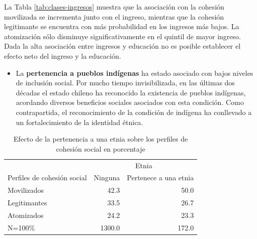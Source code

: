 \documentclass[
  12pt,
]{book}
\providecommand{\tightlist}{%
  \setlength{\itemsep}{0pt}\setlength{\parskip}{0pt}}
\begin{document}
\begin{table}

\caption{\label{tab:clases-ingresos}Efecto de los quintiles de ingreso sobre los perfiles de cohesión social en porcentaje}
\centering
{}
\end{table}

La Tabla \ref{tab:clases-ingresos} muestra que la asociación con la cohesión movilizada se incrementa junto con el ingreso, mientras que la cohesión legitimante se encuentra con más probabilidad en los ingresos más bajos. La atomización sólo disminuye significativamente en el quintil de mayor ingreso. Dada la alta asociación entre ingresos y educación no es posible establecer el efecto neto del ingreso y la educación.

\begin{itemize}
\tightlist
\item
  La \textbf{pertenencia a pueblos indígenas} ha estado asociado con bajos niveles de inclusión social. Por mucho tiempo invisibilizada, en las últimas dos décadas el estado chileno ha reconocido la existencia de pueblos indígenas, acordando diversos beneficios sociales asociados con esta condición. Como contrapartida, el reconocimiento de la condición de indígena ha conllevado a un fortalecimiento de la identidad étnica.
\end{itemize}

\begin{table}

\caption{\label{tab:clases-etnia}Efecto de la pertenencia a una etnia sobre los perfiles de cohesión social en porcentaje}
\centering
\begin{tabular}[t]{l|r|r}
\hline
\multicolumn{1}{c|}{ } & \multicolumn{2}{c}{Etnia} \\
\cline{2-3}
Perfiles de cohesión social & Ninguna & Pertenece a una etnia\\
\hline
Movilizados & 42.3 & 50.0\\
\hline
Legitimantes & 33.5 & 26.7\\
\hline
Atomizados & 24.2 & 23.3\\
\hline
N=100\% & 1300.0 & 172.0\\
\hline
\end{tabular}
\end{table}
\end{document}
